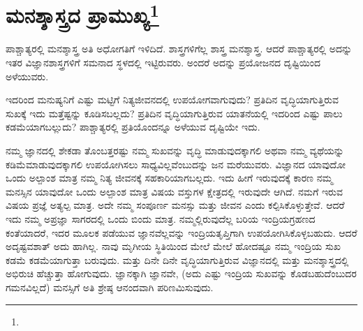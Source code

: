 
\chapter[ಮನಶ್ಶಾಸ್ತ್ರದ ಪ್ರಾಮುಖ್ಯ]{ಮನಶ್ಶಾಸ್ತ್ರದ ಪ್ರಾಮುಖ್ಯ\protect\footnote{}}

ಪಾಶ್ಚಾತ್ಯರಲ್ಲಿ ಮನಶ್ಶಾಸ್ತ್ರ ಅತಿ ಅಧೋಗತಿಗೆ ಇಳಿದಿದೆ. ಶಾಸ್ತ್ರಗಳಿಗೆಲ್ಲ ಶಾಸ್ತ್ರ ಮನಶ್ಶಾಸ್ತ್ರ. ಆದರೆ ಪಾಶ್ಚಾತ್ಯರಲ್ಲಿ ಅದನ್ನು ಇತರ ವಿಜ್ಞಾನಶಾಸ್ತ್ರಗಳಿಗೆ ಸಮನಾದ ಸ್ಥಳದಲ್ಲಿ ಇಟ್ಟಿರುವರು. ಅಂದರೆ ಅದನ್ನು ಪ್ರಯೋಜನದ ದೃಷ್ಟಿಯಿಂದ ಅಳೆಯುವರು.

ಇದರಿಂದ ಮನುಷ್ಯನಿಗೆ ಎಷ್ಟು ಮಟ್ಟಿಗೆ ನಿತ್ಯಜೀವನದಲ್ಲಿ ಉಪಯೋಗವಾಗುವುದು? ಪ್ರತಿದಿನ ವೃದ್ಧಿಯಾಗುತ್ತಿರುವ ಸುಖಕ್ಕೆ ಇದು ಮತ್ತೆಷ್ಟನ್ನು ಕೂಡಿಸಬಲ್ಲದು? ಪ್ರತಿದಿನ ವೃದ್ಧಿಯಾಗುತ್ತಿರುವ ಯಾತನೆಯಲ್ಲಿ ಇದರಿಂದ ಎಷ್ಟು ಪಾಲು ಕಡಮೆಯಾಗಬಲ್ಲುದು? ಪಾಶ್ಚಾತ್ಯರಲ್ಲಿ ಪ್ರತಿಯೊಂದನ್ನೂ ಅಳೆಯುವ ದೃಷ್ಟಿಯೇ ಇದು.

ನಮ್ಮ ಜ್ಞಾನದಲ್ಲಿ ಶೇಕಡಾ ತೊಂಬತ್ತರಷ್ಟು ನಮ್ಮ ಸುಖವನ್ನು ವೃದ್ಧಿ ಮಾಡುವುದಕ್ಕಾಗಲಿ ಅಥವಾ ನಮ್ಮ ವ್ಯಥೆಯನ್ನು ಕಡಿಮೆಮಾಡುವುದಕ್ಕಾಗಲಿ ಉಪಯೋಗಿಸಲು ಸಾಧ್ಯವಿಲ್ಲವೆಂಬುದನ್ನು ಜನ ಮರೆಯುವರು. ವಿಜ್ಞಾನದ ಯಾವುದೋ ಒಂದು ಅಲ್ಪಾಂಶ ಮಾತ್ರ ನಮ್ಮ ನಿತ್ಯ ಜೀವನಕ್ಕೆ ಸಹಕಾರಿಯಾಗಬಲ್ಲದು. ಇದು ಹೀಗೆ ಇರುವುದಕ್ಕೆ ಕಾರಣ ನಮ್ಮ ಮನಸ್ಸಿನ ಯಾವುದೋ ಒಂದು ಅಲ್ಪಾಂಶ ಮಾತ್ರ ವಿಷಯ ವಸ್ತುಗಳ ಕ್ಷೇತ್ರದಲ್ಲಿ ಇರುವುದೇ ಆಗಿದೆ. ನಮಗೆ ಇರುವ ವಿಷಯ ಪ್ರಜ್ಞೆ ಅತ್ಯಲ್ಪ ಮಾತ್ರ. ಅದೇ ನಮ್ಮ ಸಂಪೂರ್ಣ ಮನಸ್ಸು ಮತ್ತು ಜೀವನ ಎಂದು ಕಲ್ಪಿಸಿಕೊಳ್ಳುತ್ತೇವೆ. ಆದರೆ ಇದು ನಮ್ಮ ಅಪ್ರಜ್ಞಾ ಸಾಗರದಲ್ಲಿ ಒಂದು ಬಿಂದು ಮಾತ್ರ. ನಮ್ಮಲ್ಲಿರುವುದೆಲ್ಲ ಬರಿಯ ಇಂದ್ರಿಯಗ್ರಹಣದ ಕಂತೆಯಾದರೆ, ಇದರ ಮೂಲಕ ಪಡೆಯುವ ಜ್ಞಾನವೆಲ್ಲವನ್ನು ಇಂದ್ರಿಯತೃಪ್ತಿಗಾಗಿ ಉಪಯೋಗಿಸಿಕೊಳ್ಳಬಹುದು. ಆದರೆ ಅದೃಷ್ಟವಶಾತ್ ಅದು ಹಾಗಿಲ್ಲ. ನಾವು ಮೃಗೀಯ ಸ್ಥಿತಿಯಿಂದ ಮೇಲೆ ಮೇಲೆ ಹೋದಷ್ಟೂ ನಮ್ಮ ಇಂದ್ರಿಯ ಸುಖ ಕಡಮೆ ಕಡಮೆಯಾಗುತ್ತಾ ಬರುವುದು. ಮತ್ತು ದಿನೇ ದಿನೇ ವೃದ್ಧಿಯಾಗುತ್ತಿರುವ ವಿಜ್ಞಾನದಲ್ಲಿ ಮತ್ತು ಮನಶ್ಶಾಸ್ತ್ರದಲ್ಲಿ ಅಭಿರುಚಿ ಹೆಚ್ಚುತ್ತಾ ಹೋಗುವುದು. ಜ್ಞಾನಕ್ಕಾಗಿ ಜ್ಞಾನವೇ, (ಅದು ಎಷ್ಟು ಇಂದ್ರಿಯ ಸುಖವನ್ನು ಕೊಡಬಹುದೆಂಬುದರ ಗಮನವಿಲ್ಲದೆ) ಮನಸ್ಸಿಗೆ ಅತಿ ಶ್ರೇಷ್ಠ ಆನಂದವಾಗಿ ಪರಿಣಮಿಸುವುದು.

